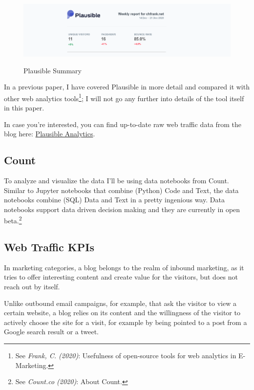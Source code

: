 \begin{figure}[H]
\centering
\caption {Plausible Summary}
\includegraphics[width=\linewidth]{images/plausible.png}
\label{fig:plausibleSummary}
\end{figure}

In a previous paper, I have covered Plausible in more detail and compared it with other web analytics tools\footnote{See \textit{Frank, C. (2020)}: Usefulness of open-source tools for web analytics in E-Marketing.\cite{previousPaper}}; I will not go any further into details of the tool itself in this paper.

In case you're interested, you can find up-to-date raw web traffic data from the blog here: \href{https://plausible.io/chfrank.net}{Plausible Analytics}.

\subsection{Count}

To analyze and visualize the data I'll be using data notebooks from Count. Similar to Jupyter notebooks that combine (Python) Code and Text, the data notebooks combine (SQL) Data and Text in a pretty ingenious way. Data notebooks support data driven decision making and they are currently in open beta.\footnote{See \textit{Count.co (2020)}: About Count.\cite{aboutCount}}

\subsection{Web Traffic KPIs}

In marketing categories, a blog belongs to the realm of inbound marketing, as it tries to offer interesting content and create value for the visitors, but does not reach out by itself. 

Unlike outbound email campaigns, for example, that ask the visitor to view a certain website, a blog relies on its content and the willingness of the visitor to actively choose the site for a visit, for example by being pointed to a post from a Google search result or a tweet.

